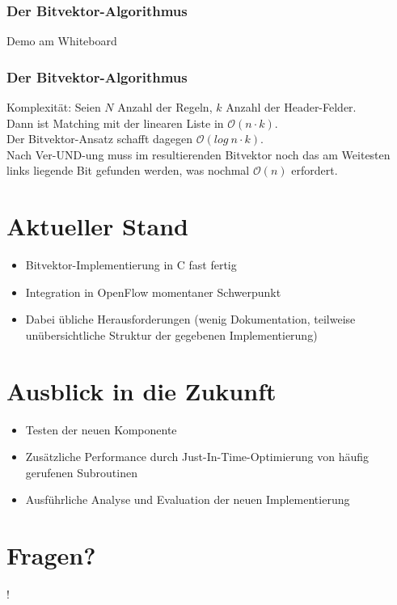 \documentclass{beamer}
\begin{document}
\begin{frame}
\frametitle{Der Bitvektor-Algorithmus}
Demo am Whiteboard
\end{frame}

\begin{frame}
\frametitle{Der Bitvektor-Algorithmus}
Komplexität: Seien $N$ Anzahl der Regeln, $k$ Anzahl der Header-Felder.\\
Dann ist Matching mit der linearen Liste in $\mathcal O(n \cdot k)$.\\
Der Bitvektor-Ansatz schafft dagegen  $\mathcal O(log\ n \cdot k)$.\\
Nach Ver-UND-ung muss im resultierenden
Bitvektor noch das am Weitesten links liegende Bit gefunden werden, was nochmal $\mathcal O(n)$ erfordert.\\
\end{frame}

\section{Aktueller Stand}
\begin{frame}
\begin{itemize}
    \item Bitvektor-Implementierung in C fast fertig
    \item Integration in OpenFlow momentaner Schwerpunkt 
    \item Dabei übliche Herausforderungen (wenig Dokumentation, teilweise unübersichtliche Struktur der gegebenen Implementierung)
\end{itemize}
\end{frame}

\section{Ausblick in die Zukunft}
\begin{frame}
\begin{itemize}
    \item Testen der neuen Komponente
    \item Zusätzliche Performance durch Just-In-Time-Optimierung von häufig gerufenen Subroutinen
    \item Ausführliche Analyse und Evaluation der neuen Implementierung
\end{itemize}
\end{frame}

\section*{Fragen?}
\begin{frame}
\begin{center}
\huge{!}
\end{center}
\end{frame}
\end{document}
